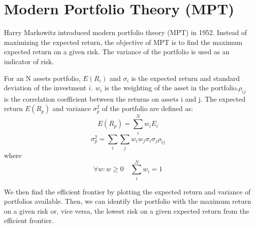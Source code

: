 \section{Modern Portfolio Theory (MPT)}
Harry Markowitz introduced modern portfolio theory (MPT) in 1952. Instead of maximizing the expected return, the objective of MPT is to find the maximum expected return on a given risk. The variance of the portfolio is used as an indicator of risk\cite{10.2307/2975974}.
\par
For an N assets portfolio, \(E(R_i)\) and  \(\sigma_i\) is the expected return and standard deviation of the investment \(i\). \(w_i\) is the weighting of the asset in the portfolio.\(\rho_{ij}\) is the correlation coefficient between the returns on assets i and j.
The expected return \(E(R_p)\) and variance \(\sigma_p^2\) of the portfolio are defined as:
\[E(R_p) = \sum_i^N w_i E_i\]
\[\sigma_p^2 = \sum_i \sum_j w_i w_j \sigma_i \sigma_j \rho_{ij}\]
where
\[\forall w: w \geq 0 \quad \sum_i ^N w_i = 1\]
\par
We then find the efficient frontier by plotting the expected return and variance of portfolios available. Then, we can identify the portfolio with the maximum return on a given risk or, vice versa, the lowest risk on a given expected return from the efficient frontier.